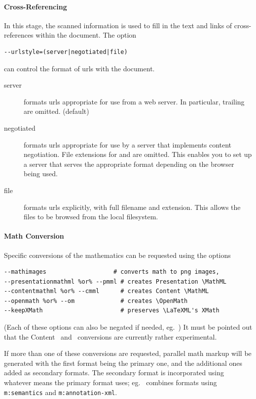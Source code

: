 \documentclass{book}
\begin{document}
\paragraph{Cross-Referencing}
In this stage, the scanned information is used to fill in the
text and links of cross-references within the document.
The option
\begin{lstlisting}[style=shell]
--urlstyle=(server|negotiated|file)
\end{lstlisting}
can control the format of urls with the document.
\begin{description}
  \item[server] formats urls appropriate for use from a web server.
    In particular, trailing  are omitted. (default)
  \item[negotiated] formats urls appropriate for use by a server
    that implements content negotiation. File extensions for 
    and  are omitted.  This enables you to set up a server
    that serves the appropriate format depending on the browser being used.
  \item[file] formats urls explicitly, with full filename and extension.
    This allows the files to be browsed from the local filesystem.
\end{description}

\paragraph{Math Conversion}
Specific conversions of the mathematics can be requested
using the options
\begin{lstlisting}[style=shell]
--mathimages                   # converts math to png images,
--presentationmathml %or% --pmml # creates Presentation \MathML
--contentmathml %or% --cmml      # creates Content \MathML
--openmath %or% --om             # creates \OpenMath
--keepXMath                      # preserves \LaTeXML's XMath
\end{lstlisting}
(Each of these options can also be negated if needed, eg.~)
It must be pointed out that the Content \MathML\ and \OpenMath\
conversions are currently rather experimental.

If more than one of these conversions are requested,
parallel math markup will be generated with the first format
being the primary one, and the additional ones added as secondary formats.
The secondary format is incorporated using whatever means
the primary format uses; eg. \MathML\ combines formats using
\texttt{m:semantics} and \texttt{m:annotation-xml}.
\end{document}
